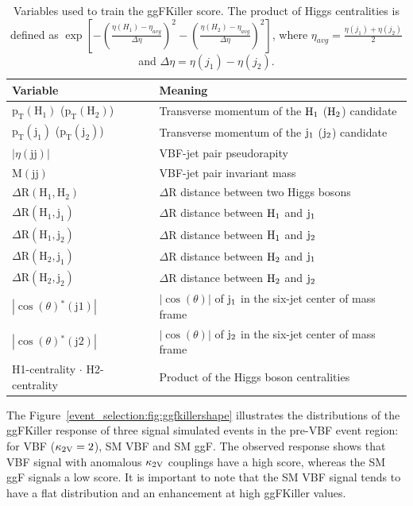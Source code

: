 \begin{table}[htb]
\caption[Variables used to train the ggFKiller score]{\label{tab:ggfkillervars}Variables used to train the ggFKiller score. The product of Higgs centralities is defined as $\exp[-(\frac{\eta(H_{1})-\eta_{avg}}{\Delta\eta})^{2} - (\frac{\eta(H_{2})-\eta_{avg}}{\Delta\eta})^{2}]$, where \hbox{$\eta_{avg}=\frac{\eta(j_1)+\eta(j_2)}{2}$} and $\Delta\eta=\eta(j_1)-\eta(j_2)$.}
\centering
\begin{tabularx}{\textwidth}{l X}
	\hline
	Variable                                   & Meaning \\
	\hline
	$\mathrm{p_{T}(H_1)}$ ($\mathrm{p_{T}(H_2)}$)      & Transverse momentum of the $\mathrm{H_{1}}$ ($\mathrm{H_{2}}$) candidate \\
	$\mathrm{p_{T}(j_1)}$ ($\mathrm{p_{T}(j_2)}$)      & Transverse momentum of the $\mathrm{j_{1}}$ ($\mathrm{j_{2}}$) candidate \\
	$|\eta(\mathrm{jj})|$                      & VBF-jet pair pseudorapity   \\
	$\mathrm{M(jj)}$                           & VBF-jet pair invariant mass \\
	$\Delta\mathrm{R(H_1,H_2)}$	               & $\Delta\mathrm{R}$ distance between two Higgs bosons    \\
	$\Delta\mathrm{R(H_1,j_1)}$	               & $\Delta\mathrm{R}$ distance between $\mathrm{H_{1}}$ and $\mathrm{j_{1}}$ \\
	$\Delta\mathrm{R(H_1,j_2)}$	               & $\Delta\mathrm{R}$ distance between $\mathrm{H_{1}}$ and $\mathrm{j_{2}}$ \\
	$\Delta\mathrm{R(H_2,j_1)}$	               & $\Delta\mathrm{R}$ distance between $\mathrm{H_{2}}$ and $\mathrm{j_{1}}$ \\
	$\Delta\mathrm{R(H_2,j_2)}$	               & $\Delta\mathrm{R}$ distance between $\mathrm{H_{2}}$ and $\mathrm{j_{2}}$ \\
	$|\mathrm{\cos}(\theta)\mathrm{^{*}(j1)}|$ & $|\cos(\theta)|$ of $\mathrm{j_{1}}$ in the six-jet center of mass frame \\	
	$|\mathrm{\cos}(\theta)\mathrm{^{*}(j2)}|$ & $|\cos(\theta)|$ of $\mathrm{j_{2}}$ in the six-jet center of mass frame \\ 	
    H1-centrality $\cdot$ H2-centrality        & Product of the Higgs boson centralities                         \\
	\hline
\end{tabularx}
\end{table}

The Figure~\ref{event_selection:fig:ggfkillershape} illustrates the distributions of the ggFKiller response of three signal simulated events in the pre-VBF event region: for VBF ($\mathrm{\kappa_{2V} }=2$), SM VBF and SM ggF. The observed response shows that VBF signal with anomalous $\mathrm{\kappa_{2V} }$ couplings have a high score, whereas the SM ggF signals a low score. It is important to note that the SM VBF signal tends to have a flat distribution and an enhancement at high ggFKiller values. 

